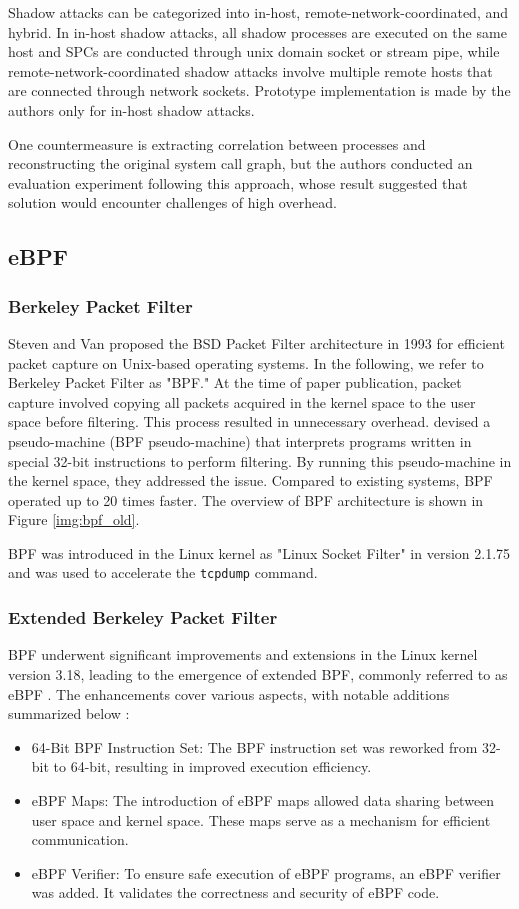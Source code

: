 Shadow attacks can be categorized into in-host, remote-network-coordinated, and hybrid.
In in-host shadow attacks, all shadow processes are executed on the same host and SPCs are conducted through
unix domain socket or stream pipe, while remote-network-coordinated shadow attacks involve multiple remote hosts
that are connected through network sockets.
Prototype implementation is made by the authors only for in-host shadow attacks.

One countermeasure is extracting correlation between processes and reconstructing
the original system call graph, but the authors conducted an evaluation experiment following this approach,
whose result suggested that solution would encounter challenges of high overhead.

\subsection{eBPF}
\subsubsection{Berkeley Packet Filter}
Steven and Van \cite{mccanne1993bsd} proposed the BSD Packet Filter architecture in 1993 for efficient packet capture on
Unix-based operating systems. In the following, we refer to Berkeley Packet Filter as "BPF."
At the time of paper publication, packet capture involved copying all packets acquired in the kernel
space to the user space before filtering.
This process resulted in unnecessary overhead. \cite{mccanne1993bsd} devised a pseudo-machine (BPF pseudo-machine)
that interprets programs written in special 32-bit instructions to perform filtering.
By running this pseudo-machine in the kernel space, they addressed the issue. Compared to existing systems,
BPF operated up to 20 times faster.
The overview of BPF architecture is shown in Figure \ref{img:bpf_old}.

BPF was introduced in the Linux kernel as "Linux Socket Filter" in version 2.1.75 and
was used to accelerate the \texttt{tcpdump} command.

\subsubsection{Extended Berkeley Packet Filter}
BPF underwent significant improvements and extensions in the Linux kernel version 3.18,
leading to the emergence of extended BPF, commonly referred to as eBPF \cite{Linux31836:online}.
The enhancements cover various aspects, with notable additions summarized below \cite{learning-ebpf}:
\begin{itemize}
  \item 64-Bit BPF Instruction Set: The BPF instruction set was reworked from 32-bit to 64-bit, resulting in improved execution efficiency.
  \item eBPF Maps: The introduction of eBPF maps allowed data sharing between user space and kernel space. These maps serve as a mechanism for efficient communication.
  \item eBPF Verifier: To ensure safe execution of eBPF programs, an eBPF verifier was added. It validates the correctness and security of eBPF code.
\end{itemize}

